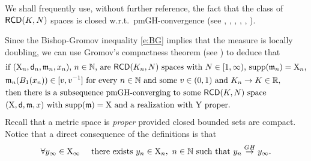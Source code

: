 \documentclass[reqno,11pt]{article}
\numberwithin{equation}{section}
\newcommand{\N}{\mathbb{N}}
\newcommand{\R}{\mathbb{R}}
\newcommand{\mm}{{\mbox{\boldmath$m$}}}
\newcommand{\sfd}{{\sf d}}
\newcommand{\supp}{\mathop{\rm supp}\nolimits}   %
\renewcommand{\mm}{\mathfrak m}                                %
\newcommand{\X}{{\rm X}}
\newcommand{\Y}{{\rm Y}}
\newcommand{\RCD}{{\sf RCD}}
\begin{document}
We shall frequently use, without further reference, the fact that the class of $\RCD(K,N)$ spaces is closed w.r.t.\ pmGH-convergence  (see \cite{Lott-Villani09}, \cite{Sturm06I}, \cite{Sturm06II}, \cite{AmbrosioGigliSavare11-2}, \cite{Gigli12}, \cite{GMS15}).

Since the Bishop-Gromov inequality \eqref{e:BG} implies that the measure is locally doubling, we can use Gromov's compactness theorem  (see \cite[Section 5.A]{Gromov07}) to deduce  that
\begin{equation}
\label{eq:Gcomp}
\begin{split}
&\text{if  $(\X_n,\sfd_n,\mm_n,x_n)$, $n\in\N$, are $\RCD(K_n,N)$ spaces with  $N\in[1,\infty)$, $\supp(\mm_n)=\X_n$,}\\
&\text{$\mm_n(B_1(x_n))\in[v,v^{-1}]$ for every $n\in\N$ and some $v\in(0,1)$ and $K_n\to K\in\R$,}\\
&\text{then there is a subsequence pmGH-converging to some $\RCD(K,N)$ space}\\
&\text{$(\X,\sfd,\mm,x)$ with $\supp(\mm)=\X$ and a realization  with $\Y$  proper.}\\
\end{split}
\end{equation} 
{ Recall that a metric space is \emph{proper} provided closed bounded sets are compact. }
Notice that a direct consequence of the definitions is that
\begin{equation}
\label{eq:exseq}
\forall y_\infty\in \X_\infty\quad\text{ there exists }y_n\in\X_n,\ n\in\N\text{ such that }y_n\stackrel{GH}\to y_\infty.
\end{equation}
\end{document}
